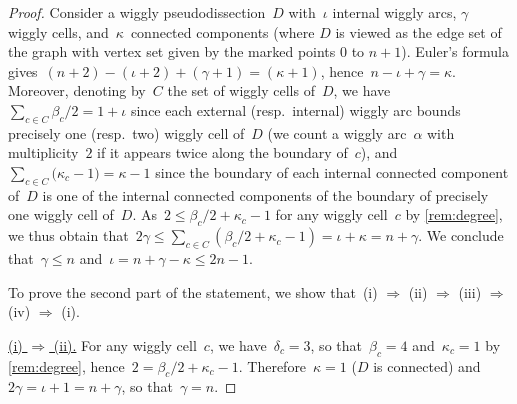 \documentclass{amsart}
\theoremstyle{definition}
\newcommand{\para}[1]{\smallskip\noindent\uline{#1.}} %
\begin{document}
\begin{proof}
Consider a wiggly pseudodissection~$D$ with~$\iota$ internal wiggly arcs, $\gamma$ wiggly cells, and~$\kappa$~connected components (where $D$ is viewed as the edge set of the graph with vertex set given by the marked points $0$ to $n+1$).
Euler's formula gives~$(n+2)-(\iota+2)+(\gamma+1)=(\kappa+1)$, hence~$n - \iota + \gamma = \kappa$.
Moreover, denoting by~$C$ the set of wiggly cells of~$D$, we have~$\sum_{c \in C} \beta_c/2 = 1+\iota$ since each external (resp.~internal) wiggly arc bounds precisely one (resp.~two) wiggly cell of~$D$ (we count a wiggly arc~$\alpha$ with multiplicity~$2$ if it appears twice along the boundary of~$c$), and~${\sum_{c \in C} \big( \kappa_c-1 \big) = \kappa-1}$ since the boundary of each internal connected component of~$D$ is one of the internal connected components of the boundary of precisely one wiggly cell of~$D$.
As~$2 \le \beta_c/2+\kappa_c-1$ for any wiggly cell~$c$ by \cref{rem:degree}, we thus obtain that~$2\gamma \le \sum_{c \in C} (\beta_c/2+\kappa_c-1) = \iota+\kappa = n+\gamma$.
We conclude that~$\gamma \le n$ and~$\iota = n+\gamma-\kappa \le 2n-1$.


To prove the second part of the statement, we show that~(i) $\Rightarrow$ (ii) $\Rightarrow$ (iii) $\Rightarrow$ (iv) $\Rightarrow$ (i).

\para{(i) $\Rightarrow$ (ii)}
For any wiggly cell~$c$, we have~$\delta_c = 3$, so that~$\beta_c = 4$ and~$\kappa_c = 1$ by \cref{rem:degree}, hence~$2 = \beta_c/2+\kappa_c-1$.
Therefore~$\kappa = 1$ ($D$ is connected) and~$2\gamma = \iota+1 = n+\gamma$, so that~$\gamma=n$.


\end{proof}
\end{document}
